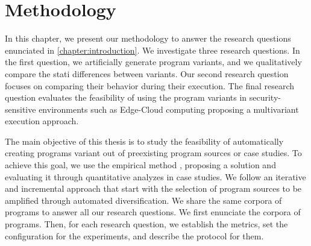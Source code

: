 \chapter{Methodology} 
\label{chapter:method}

\pagestyle{plain}
\newcommand{\libsodiumfunctions}{869}
\newcommand{\qrcodefunctions}{1849}
\newcommand{\allmewefunctions}{\libsodiumfunctions + \qrcodefunctions}

\newcommand{\py}[1]{}
\newcommand{\fromjson}[2]{}

\newcommand{\corpusrosetta}{\fromjson{data/crow_corpus.json}{.[0].name}}
\newcommand{\corpussodium}{Libsodium\xspace}
\newcommand{\corpusqrcode}{QrCode\xspace}


\newcommand{\DTWStatic}{dt\_static\xspace}
\newcommand{\DTW}{dt\_dyn\xspace}
\newcommand{\tool}{CROW\xspace}


In this chapter, we present our methodology to answer the research questions enunciated in \autoref{chapter:introduction}.
We investigate three research questions. In the first question, we artificially generate \wasm program variants, and we qualitatively compare the stati differences between variants. 
Our second research question focuses on comparing their behavior during their execution.
The final research question evaluates the feasibility of using the program variants in security-sensitive environments such as Edge-Cloud computing proposing a multivariant execution approach.

The main objective of this thesis is to study the feasibility of automatically creating programs variant out of preexisting program sources or case studies. To achieve this goal,
we use the empirical method \cite{}, proposing a solution and evaluating it through quantitative analyzes in case studies. We follow an iterative and incremental approach that start with the selection of program sources to be amplified through automated diversification. 
We share the same corpora of programs to answer all our research questions. We first enunciate the corpora of programs. Then, for each research question, we establish the metrics, set the configuration for the experiments, and describe the protocol for them.



